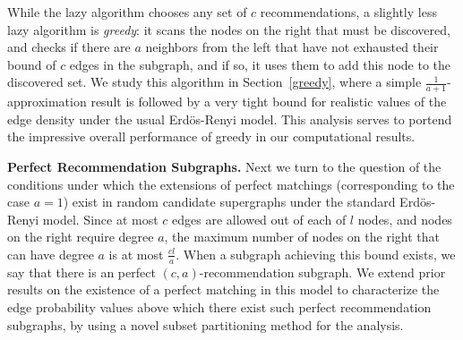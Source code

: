 \noindent
While the lazy algorithm chooses any set of $c$ recommendations, a slightly less lazy algorithm is {\em greedy}: it scans the nodes on the right that must be discovered, and checks if there are $a$ neighbors from the left that have not exhausted their bound of $c$ edges in the subgraph, and if so, it uses them to add this node to the discovered set. We study this algorithm in Section~\ref{greedy}, where a simple $\frac{1}{a+1}$-approximation result is followed by a very tight bound for realistic values of the edge density under the usual Erd\"os-Renyi model\cite{ErdosRenyi59}. This analysis serves to portend the impressive overall performance of greedy in our computational results. \vs

\noindent
{\bf Perfect Recommendation Subgraphs.} Next we turn to the question of the conditions under which the extensions of perfect matchings (corresponding to the case $a=1$) exist in random candidate supergraphs under the standard Erd\"os-Renyi model. Since at most $c$ edges are allowed out of each of $l$ nodes, and nodes on the right require degree $a$, the maximum number of nodes on the right that can have degree $a$ is at most $\frac{cl}{a}$. When a subgraph achieving this bound exists, we say that there is an perfect $(c,a)$-recommendation subgraph. We extend prior results on the
existence of a perfect matching in this model to characterize the edge probability values above which there exist such perfect recommendation subgraphs, by using a novel subset partitioning method for the analysis. \vs
 

